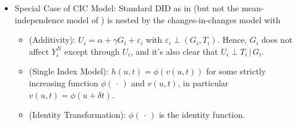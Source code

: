 \documentclass[12pt]{article}
\theoremstyle{plain}
\theoremstyle{definition}
\theoremstyle{remark}
\begin{document}
\begin{itemize}
  \item Special Case of CIC Model:
    Standard DID as in \cite{blundellmacurdy2000} (but not the
    mean-independence model of \cite{abadie2005}) is nested by the
    changes-in-changes model with
    \begin{itemize}
      \item
        (Additivity):
        $U_i=\alpha + \gamma G_i + \varepsilon_i$ with
        $\varepsilon_i\perp (G_i,T_i)$.
        Hence, $G_i$ does not affect $Y_i^N$ except through $U_i$, and
        it's also clear that $U_i \perp T_i\,|\,G_i$.

      \item (Single Index Model):
        $h(u,t)=\phi(v(u,t))$ for some strictly increasing function
        $\phi(\,\cdot\,)$ and $v(u,t)$, in particular
        $v(u,t)=\phi(u+\delta t)$.

      \item (Identity Transformation):
        $\phi(\,\cdot\,)$ is the identity function.
    \end{itemize}
\end{itemize}

\clearpage
\end{document}
